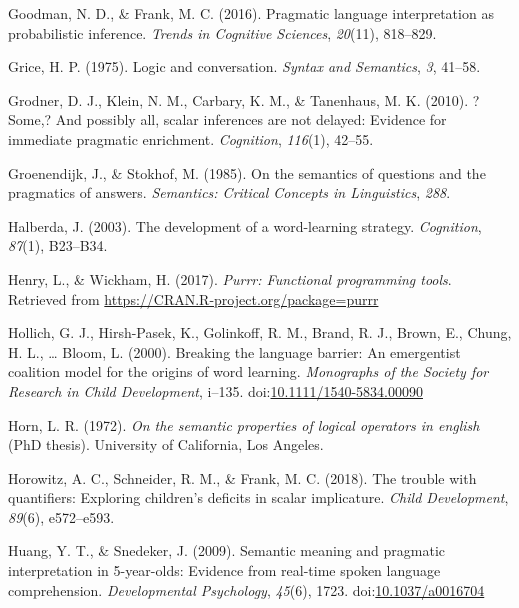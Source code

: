 \documentclass[man]{apa6}
\theoremstyle{definition}
\theoremstyle{definition}
\theoremstyle{definition}
\theoremstyle{remark}
\begin{document}
\hypertarget{ref-goodman2016}{}
Goodman, N. D., \& Frank, M. C. (2016). Pragmatic language
interpretation as probabilistic inference. \emph{Trends in Cognitive
Sciences}, \emph{20}(11), 818--829.

\hypertarget{ref-grice1975logic}{}
Grice, H. P. (1975). Logic and conversation. \emph{Syntax and
Semantics}, \emph{3}, 41--58.

\hypertarget{ref-grodner2010}{}
Grodner, D. J., Klein, N. M., Carbary, K. M., \& Tanenhaus, M. K.
(2010). ?Some,? And possibly all, scalar inferences are not delayed:
Evidence for immediate pragmatic enrichment. \emph{Cognition},
\emph{116}(1), 42--55.

\hypertarget{ref-groenendijk1985semantics}{}
Groenendijk, J., \& Stokhof, M. (1985). On the semantics of questions
and the pragmatics of answers. \emph{Semantics: Critical Concepts in
Linguistics}, \emph{288}.

\hypertarget{ref-halberda2003development}{}
Halberda, J. (2003). The development of a word-learning strategy.
\emph{Cognition}, \emph{87}(1), B23--B34.

\hypertarget{ref-R-purrr}{}
Henry, L., \& Wickham, H. (2017). \emph{Purrr: Functional programming
tools}. Retrieved from \url{https://CRAN.R-project.org/package=purrr}

\hypertarget{ref-hollich2000}{}
Hollich, G. J., Hirsh-Pasek, K., Golinkoff, R. M., Brand, R. J., Brown,
E., Chung, H. L., \ldots{} Bloom, L. (2000). Breaking the language
barrier: An emergentist coalition model for the origins of word
learning. \emph{Monographs of the Society for Research in Child
Development}, i--135.
doi:\href{https://doi.org/10.1111/1540-5834.00090}{10.1111/1540-5834.00090}

\hypertarget{ref-horn1972}{}
Horn, L. R. (1972). \emph{On the semantic properties of logical
operators in english} (PhD thesis). University of California, Los
Angeles.

\hypertarget{ref-horowitz2018}{}
Horowitz, A. C., Schneider, R. M., \& Frank, M. C. (2018). The trouble
with quantifiers: Exploring children's deficits in scalar implicature.
\emph{Child Development}, \emph{89}(6), e572--e593.

\hypertarget{ref-huang2009b}{}
Huang, Y. T., \& Snedeker, J. (2009). Semantic meaning and pragmatic
interpretation in 5-year-olds: Evidence from real-time spoken language
comprehension. \emph{Developmental Psychology}, \emph{45}(6), 1723.
doi:\href{https://doi.org/10.1037/a0016704}{10.1037/a0016704}
\end{document}
